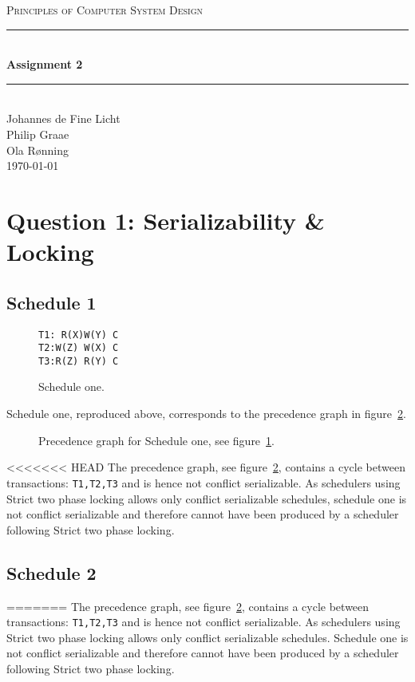 \documentclass[12pt]{article}
\newcommand{\HRule}{\rule{\linewidth}{0.5mm}}
\begin{document}
\begin{center}
\textsc{\LARGE Principles of Computer System Design}\\[0.3cm] %
\HRule \\[0.4cm]
{ \huge \bfseries Assignment 2} %
\HRule \\[0.4cm]
\large
Johannes de Fine Licht %
\\Philip Graae
\\Ola Rønning
\\\today
\end{center}

\section*{Question 1: Serializability \& Locking} %

\subsection*{Schedule 1}
\begin{figure}[h!]
\texttt{T1: R(X)\hspace{250pt}W(Y) C\\
T2:\hspace{50pt}W(Z) W(X) C \\
T3:\hspace{150pt}R(Z) R(Y) C}
\caption{Schedule one.}
\label{sch1}
\end{figure}
Schedule one, reproduced above, corresponds to the precedence graph in figure~\ref{p1}.
\begin{figure}[h!]
\centering
{}
\caption{Precedence graph for Schedule one, see figure~\ref{sch1}.}
\label{p1}
\end{figure}
<<<<<<< HEAD
The precedence graph, see figure~\ref{p1}, contains a cycle between transactions: \texttt{T1,T2,T3} and is hence not conflict serializable. As schedulers using Strict two phase locking allows only conflict serializable schedules, schedule one is not conflict serializable and therefore cannot have been produced by a scheduler following Strict two phase locking.
\subsection*{Schedule 2}
=======
The precedence graph, see figure~\ref{p1}, contains a cycle between transactions: \texttt{T1,T2,T3} and is hence not conflict serializable. As schedulers using Strict two phase locking allows only conflict serializable schedules. Schedule one is not conflict serializable and therefore cannot have been produced by a scheduler following Strict two phase locking.
\end{document}
